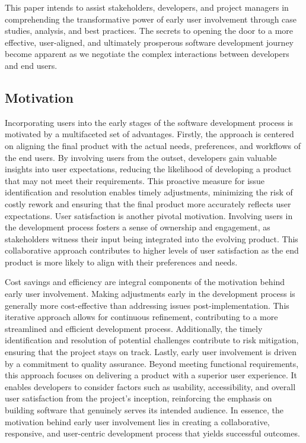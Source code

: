 \documentclass[runningheads]{llncs}
\begin{document}
This paper intends to assist stakeholders, developers, and project managers in comprehending the transformative power of early user involvement through case studies, analysis, and best practices. The secrets to opening the door to a more effective, user-aligned, and ultimately prosperous software development journey become apparent as we negotiate the complex interactions between developers and end users.


\subsection{Motivation}
Incorporating users into the early stages of the software development process is motivated by a multifaceted set of advantages. Firstly, the approach is centered on aligning the final product with the actual needs, preferences, and workflows of the end users. By involving users from the outset, developers gain valuable insights into user expectations, reducing the likelihood of developing a product that may not meet their requirements. This proactive measure for issue identification and resolution enables timely adjustments, minimizing the risk of costly rework and ensuring that the final product more accurately reflects user expectations. User satisfaction is another pivotal motivation. Involving users in the development process fosters a sense of ownership and engagement, as stakeholders witness their input being integrated into the evolving product. This collaborative approach contributes to higher levels of user satisfaction as the end product is more likely to align with their preferences and needs.

Cost savings and efficiency are integral components of the motivation behind early user involvement. Making adjustments early in the development process is generally more cost-effective than addressing issues post-implementation. This iterative approach allows for continuous refinement, contributing to a more streamlined and efficient development process. Additionally, the timely identification and resolution of potential challenges contribute to risk mitigation, ensuring that the project stays on track. Lastly, early user involvement is driven by a commitment to quality assurance. Beyond meeting functional requirements, this approach focuses on delivering a product with a superior user experience. It enables developers to consider factors such as usability, accessibility, and overall user satisfaction from the project's inception, reinforcing the emphasis on building software that genuinely serves its intended audience. In essence, the motivation behind early user involvement lies in creating a collaborative, responsive, and user-centric development process that yields successful outcomes.
\end{document}
